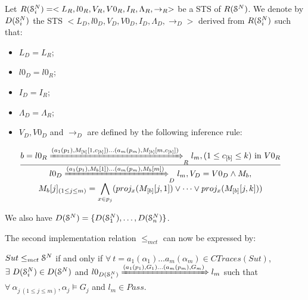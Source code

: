 \begin{definition}
    Let
    $R(\EuScript{S}_i^{N})=<L_R,l0_R,V_R,V0_R,I_R,\Lambda_R,\rightarrow_R>$
    be a STS of $R(\EuScript{S}^{N})$. We denote by
    $D(\EuScript{S}_i^{N})$ the STS $
    <L_D,l0_D,V_D,V0_D,I_D,\Lambda_D,\rightarrow_D>$ derived from
    $R(\EuScript{S}_i^{N})$ such that:

    \begin{itemize}
        \item $L_D=L_{R}$;

        \item $l0_D=l0_{R}$;

        \item $I_D=I_{R}$;

        \item $\Lambda_D=\Lambda_{R}$;

        \item $V_D, V0_D$ and $\rightarrow_D$ are defined by the
            following inference rule:

            $\frac{
                \begin{matrix}
                b=l0_{R}
                \xRightarrow{(a_1(p_1),M_{[b]}[1,c_{[b]}])\dots
                (a_m(p_m),M_{[b]}[m,c_{[b]}])}_{R}
                l_{m},
                (1 \leq c_{[b]} \leq k) \text{ in } V0_{R}
                \end{matrix}
            }
            {
                \begin{matrix}
                l0_D
                \xRightarrow{(a_1(p_1),M_{b}[1])\dots (a_m(p_m),M_{b}[m])}_{D}
                l_m, V_D=V0_D \wedge M_{b},\\
                M_{b}[j]_{(1\leq j \leq m)} = \displaystyle
                \bigwedge_{x \in p_j} ( proj_x(M_{[b]}[j, 1])
                \vee \dots \vee proj_x(M_{[b]}[j, k]))

                \end{matrix}
            }$
    \end{itemize}

    We also have $D(\EuScript{S}^{N}) =
    \{D(\EuScript{S}_1^{N}),\dots,D(\EuScript{S}_n^{N}) \}$.
\end{definition}

The second implementation relation $\leq_{mct}$ can now be
expressed by:

\begin{proposition}
    ${Sut} \leq_{mct} \EuScript{S}^{N}$ if and only if $\forall
    ~t= a_1(\alpha_1) \dots a_m(\alpha_m) \in CTraces({Sut})$,
    $\exists ~D(\EuScript{S}_i^{N}) \in D(\EuScript{S}^{N})$ and
    $l0_{D(\EuScript{S}_i^{N})} \xRightarrow{(a_1(p_1),G_{1})
    \dots (a_m(p_m),G_{m})} l_m$ such that $\forall
    ~\alpha_{j ~(1 \leq j \leq m)}, \alpha_j \models G_{j}$ and
    $l_m \in Pass$.
\end{proposition}


